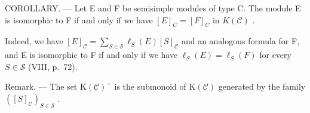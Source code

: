 COROLLARY. --- Let E and F be semisimple modules of type C. The module E is isomorphic to F if and only if we have \([E]_{C} = [F]_{C}\) in \(K(\mathcal{C})\) .

Indeed, we have \([E]_{\mathcal{C}} = \sum_{S \in \mathcal{S}} \ell_{S}(E)[S]_{\mathcal{C}}\) and an analogous formula for F, and E is isomorphic to F if and only if we have \(\ell_{S}(E) = \ell_{S}(F)\) for every \(S \in \mathcal{S}\) (VIII, p.~72).

Remark. --- The set \(\mathrm{K}(\mathcal{C})^{+}\) is the submonoid of \(\mathrm{K}(\mathcal{C})\) generated by the family \(([S]_{\mathcal{C}})_{S\in\mathcal{S}}\) .

